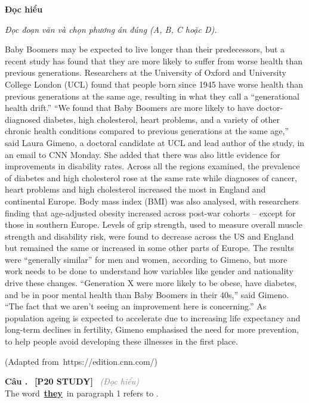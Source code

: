 \documentclass[12pt,a4paper,twoside]{article}
\newcounter{qcounter}
\newcommand{\question}[2][]{%
    \stepcounter{qcounter}%
    \par\vspace{6pt}%
    \noindent\textcolor{primaryBlue}{\textbf{Câu \theqcounter.}}~%
    \textcolor{secondaryBlue}{\small\textbf{[P20 STUDY]}}~%
    \if\relax\detokenize{#1}\relax\else\textcolor{gray}{\small\textit{(#1)}}~\fi\\[1pt]
    \noindent #2%
}
\newenvironment{readingpassage}[1][]{%
    \begin{tcolorbox}[enhanced, colback=grayLight, colframe=secondaryBlue,
        coltitle=textDark, fonttitle=\bfseries, title={#1},
        rounded corners, arc=3mm, boxrule=1pt,
        left=15pt, right=15pt, top=10pt, bottom=10pt,
        breakable, before skip=10pt, after skip=10pt, drop fuzzy shadow]
    \setstretch{1.3}
}{\end{tcolorbox}}
\begin{document}
\begin{groupbox}\textbf{\large Đọc hiểu}\end{groupbox}
\textit{Đọc đoạn văn và chọn phương án đúng (A, B, C hoặc D).}
\begin{readingpassage}[]
Baby Boomers may be expected to live longer than their predecessors, but a recent study has found that they are more likely to suffer from worse health than previous generations. Researchers at the University of Oxford and University College London (UCL) found that people born since 1945 have worse health than previous generations at the same age, resulting in what they call a “generational health drift.” “We found that Baby Boomers are more likely to have doctor-diagnosed diabetes, high cholesterol, heart problems, and a variety of other chronic health conditions compared to previous generations at the same age,” said Laura Gimeno, a doctoral candidate at UCL and lead author of the study, in an email to CNN Monday. She added that there was also little evidence for improvements in disability rates. Across all the regions examined, the prevalence of diabetes and high cholesterol rose at the same rate while diagnoses of cancer, heart problems and high cholesterol increased the most in England and continental Europe. Body mass index (BMI) was also analysed, with researchers finding that age-adjusted obesity increased across post-war cohorts – except for those in southern Europe. Levels of grip strength, used to measure overall muscle strength and disability risk, were found to decrease across the US and England but remained the same or increased in some other parts of Europe. The results were “generally similar” for men and women, according to Gimeno, but more work needs to be done to understand how variables like gender and nationality drive these changes. “Generation X were more likely to be obese, have diabetes, and be in poor mental health than Baby Boomers in their 40s,” said Gimeno. “The fact that we aren’t seeing an improvement here is concerning.” As population ageing is expected to accelerate due to increasing life expectancy and long-term declines in fertility, Gimeno emphasised the need for more prevention, to help people avoid developing these illnesses in the first place.

(Adapted from https://edition.cnn.com/)
\end{readingpassage}

\question[Đọc hiểu]{The word \underline{\textbf{they}} in paragraph 1 refers to \underline{\hspace{1.3cm}}.}
\end{document}
